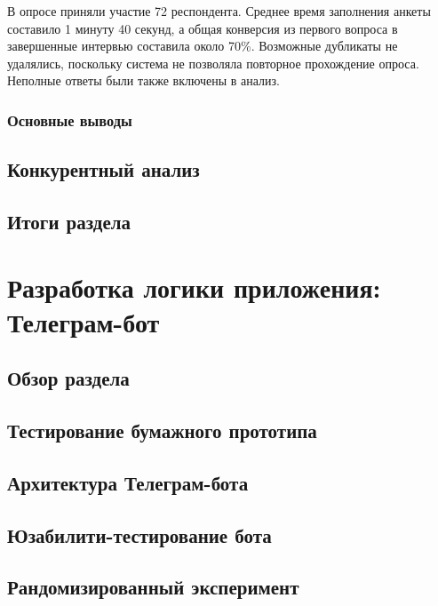\documentclass[pdflatex,sn-mathphys-num]{sn-jnl}%
\theoremstyle{thmstyleone}%
\theoremstyle{thmstyletwo}%
\theoremstyle{thmstylethree}%
\begin{document}
В опросе приняли участие 72 респондента. Среднее время заполнения анкеты составило 1 минуту 40 секунд, а общая конверсия из первого вопроса в завершенные интервью составила около 70\%. Возможные дубликаты не удалялись, поскольку система не позволяла повторное прохождение опроса. Неполные ответы были также включены в анализ.



\subsubsection{Основные выводы}

\subsection{Конкурентный анализ}\label{Competitor Analysis}

\subsection{Итоги раздела}\label{Requirements}

\section{Разработка логики приложения: Телеграм-бот}\label{Development}

\subsection{Обзор раздела}

\subsection{Тестирование бумажного прототипа}

\subsection{Архитектура Телеграм-бота}

\subsection{Юзабилити-тестирование бота}

\subsection{Рандомизированный эксперимент}
\end{document}
